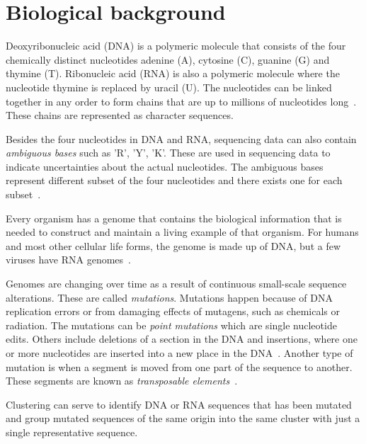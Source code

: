 \section{Biological background}
\label{sec:biology}

Deoxyribonucleic acid (DNA) is a polymeric molecule that consists of the four
chemically distinct nucleotides adenine (A), cytosine (C), guanine (G) and
thymine (T). Ribonucleic acid (RNA) is also a polymeric molecule where the
nucleotide thymine is replaced by uracil (U). The nucleotides can be linked
together in any order to form chains that are up to millions of nucleotides
long~\cite[pp.~8--9]{brown}. These chains are represented as character
sequences.

Besides the four nucleotides in DNA and RNA, sequencing data can also contain
\emph{ambiguous bases} such as 'R', 'Y', 'K'. These are used in sequencing data
to indicate uncertainties about the actual nucleotides. The ambiguous bases
represent different subset of the four nucleotides and there exists one for
each subset~\cite{tao}.

Every organism has a genome that contains the biological information that is
needed to construct and maintain a living example of that organism. For humans
and most other cellular life forms, the genome is made up of DNA, but a few
viruses have RNA genomes~\cite[pp.~3--4]{brown}.

Genomes are changing over time as a result of continuous small-scale sequence
alterations. These are called \textit{mutations}. Mutations happen because of
DNA replication errors or from damaging effects of mutagens, such as chemicals
or radiation. The mutations can be \textit{point mutations} which are single
nucleotide edits. Others include deletions of a section in the DNA and
insertions, where one or more nucleotides are inserted into a new place in the
DNA~\cite[pp.~505--506]{brown}. Another type of mutation is when a segment is
moved from one part of the sequence to another. These segments are known as
\emph{transposable elements}~\cite{munoz}.

Clustering can serve to identify DNA or RNA sequences that has been mutated and
group mutated sequences of the same origin into the same cluster with just a
single representative sequence.
